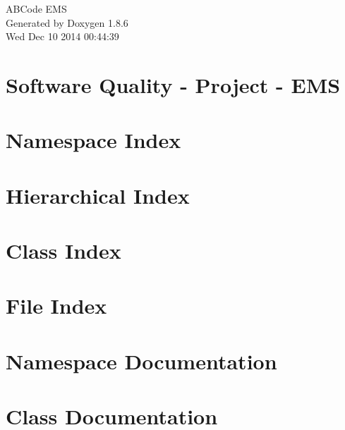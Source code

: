 \documentclass[twoside]{book}
\newcommand{\clearemptydoublepage}{%
  \newpage{\pagestyle{empty}\cleardoublepage}%
}
\begin{document}
\hypersetup{pageanchor=false}
\begin{titlepage}
\vspace*{7cm}
\begin{center}%
{\Large A\-B\-Code E\-M\-S }\\
\vspace*{1cm}
{\large Generated by Doxygen 1.8.6}\\
\vspace*{0.5cm}
{\small Wed Dec 10 2014 00:44:39}\\
\end{center}
\end{titlepage}
\clearemptydoublepage
\tableofcontents
\clearemptydoublepage
{}
\hypersetup{pageanchor=true}

\chapter{Software Quality -\/ Project -\/ E\-M\-S}
\label{index}\hypertarget{index}{}
\chapter{Namespace Index}

\chapter{Hierarchical Index}

\chapter{Class Index}

\chapter{File Index}

\chapter{Namespace Documentation}







\chapter{Class Documentation}
















\end{document}
